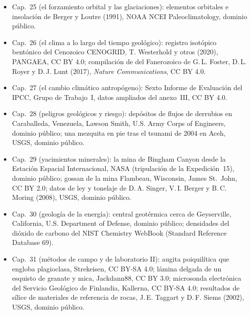 \begin{itemize}
  \item Cap.~25 (el forzamiento orbital y las glaciaciones): elementos orbitales e insolación de Berger y Loutre (1991), NOAA NCEI Paleoclimatology, dominio público.
  \item Cap.~26 (el clima a lo largo del tiempo geológico): registro isotópico bentónico del Cenozoico CENOGRID, T. Westerhold y otros (2020), PANGAEA, CC BY 4.0; compilación de  del Fanerozoico de G.\,L. Foster, D.\,L. Royer y D.\,J. Lunt (2017), \emph{Nature Communications}, CC BY 4.0.
  \item Cap.~27 (el cambio climático antropógeno): Sexto Informe de Evaluación del IPCC, Grupo de Trabajo~I, datos ampliados del anexo~III, CC BY 4.0.
  \item Cap.~28 (peligros geológicos y riesgo): depósitos de flujos de derrubios en Caraballeda, Venezuela, Lawson Smith, U.S. Army Corps of Engineers, dominio público; una mezquita en pie tras el tsunami de 2004 en Aceh, USGS, dominio público.
  \item Cap.~29 (yacimientos minerales): la mina de Bingham Canyon desde la Estación Espacial Internacional, NASA (tripulación de la Expedición~15), dominio público; gossan de la mina Flambeau, Wisconsin, James St.~John, CC BY 2.0; datos de ley y tonelaje de D.\,A. Singer, V.\,I. Berger y B.\,C. Moring (2008), USGS, dominio público.
  \item Cap.~30 (geología de la energía): central geotérmica cerca de Geyserville, California, U.S. Department of Defense, dominio público; densidades del dióxido de carbono del NIST Chemistry WebBook (Standard Reference Database 69).
  \item Cap.~31 (métodos de campo y de laboratorio II): augita poiquilítica que engloba plagioclasa, Strekeisen, CC BY-SA 4.0; lámina delgada de un esquisto de granate y mica, Jackdann88, CC BY 3.0; microsonda electrónica del Servicio Geológico de Finlandia, Kallerna, CC BY-SA 4.0; resultados de sílice de materiales de referencia de rocas, J.\,E. Taggart y D.\,F. Siems (2002), USGS, dominio público.
\end{itemize}
